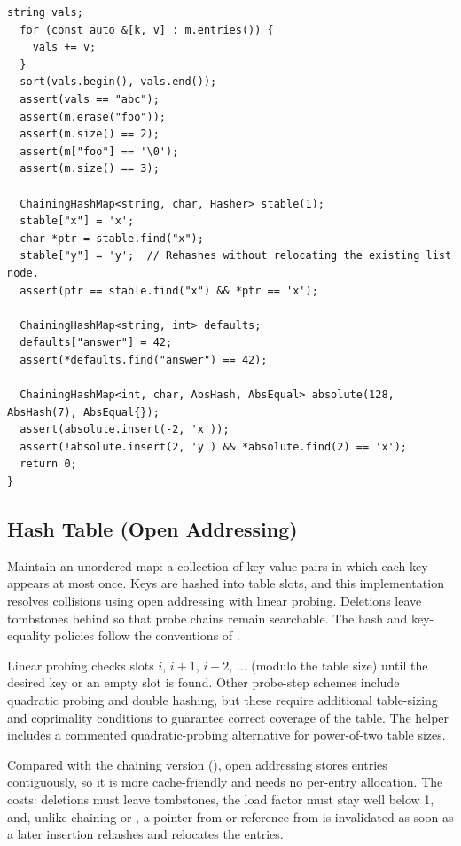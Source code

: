\begin{lstlisting}[style=cpp]
  string vals;
  for (const auto &[k, v] : m.entries()) {
    vals += v;
  }
  sort(vals.begin(), vals.end());
  assert(vals == "abc");
  assert(m.erase("foo"));
  assert(m.size() == 2);
  assert(m["foo"] == '\0');
  assert(m.size() == 3);

  ChainingHashMap<string, char, Hasher> stable(1);
  stable["x"] = 'x';
  char *ptr = stable.find("x");
  stable["y"] = 'y';  // Rehashes without relocating the existing list node.
  assert(ptr == stable.find("x") && *ptr == 'x');

  ChainingHashMap<string, int> defaults;
  defaults["answer"] = 42;
  assert(*defaults.find("answer") == 42);

  ChainingHashMap<int, char, AbsHash, AbsEqual> absolute(128, AbsHash(7), AbsEqual{});
  assert(absolute.insert(-2, 'x'));
  assert(!absolute.insert(2, 'y') && *absolute.find(2) == 'x');
  return 0;
}
\end{lstlisting}
\subsection{Hash Table (Open Addressing)}
\label{sec:2.4.10}
Maintain an unordered map: a collection of key-value pairs in which each key appears at most once. Keys are hashed into table slots, and this implementation resolves collisions using open addressing with linear probing. Deletions leave tombstones behind so that probe chains remain searchable. The hash and key-equality policies follow the conventions of .

Linear probing checks slots $i$, $i + 1$, $i + 2$, ... (modulo the table size) until the desired key or an empty slot is found. Other probe-step schemes include quadratic probing and double hashing, but these require additional table-sizing and coprimality conditions to guarantee correct coverage of the table. The  helper includes a commented quadratic-probing alternative for power-of-two table sizes.

Compared with the chaining version (), open addressing stores entries contiguously, so it is more cache-friendly and needs no per-entry allocation. The costs: deletions must leave tombstones, the load factor must stay well below 1, and, unlike chaining or , a pointer from  or reference from  is invalidated as soon as a later insertion rehashes and relocates the entries.

